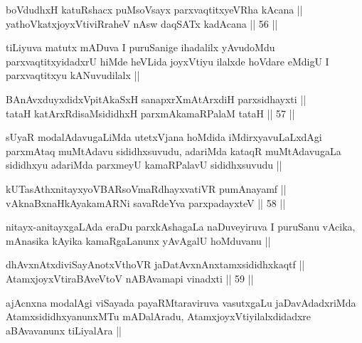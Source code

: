 \begin{shl}
boVdudhxH katuRshacx puMsoV\s sayx parxvaqtitxyeVRha kAcana ||  \\
yathoVkatxjoyxVtiviRraheV nAsw daqSATx kadAcana ||  56 ||  
\end{shl}

\begin{artha}
tiLiyuva matutx mADuva I puruSanige ihadalilx yAvudoMdu parxvaqtitxyidadxrU hiMde heVLida joyxVtiyu ilalxde hoVdare eMdigU I parxvaqtitxyu kANuvudilalx ||
\end{artha}

\begin{shl}
BAnAvxduyxdidxVpitAkaSxH sanapxrXmAtArxdiH parxsidhayxti || \\
tataH katArxRdisaMsididhxH parxmAkamaRPalaM tataH ||  57 ||  
\end{shl}

\begin{artha}
sUyaR modalAdavugaLiMda utetxVjana hoMdida iMdirxyavuLaLxdAgi parxmAtaq muMtAdavu sididhxsuvudu, adariMda kataqR muMtAdavugaLa sididhxyu adariMda parxmeyU kamaRPalavU sididhxsuvudu ||
\end{artha}

\begin{shl}
kUTasAthxnitayxyoVBARsoVmaRdhayxvatiVR pumAnayamf || \\
vAknaBxnaHkAyakamARNi savaRdeYva parxpadayxteV ||  58 ||  
\end{shl}

\begin{artha}
nitayx-anitayxgaLAda eraDu parxkAshagaLa naDuveyiruva I puruSanu vAcika, mAnasika kAyika kamaRgaLanunx yAvAgalU hoMduvanu ||
\end{artha}

\begin{shl}
dhAvxnAtxdiviSayAnotxV\s thoVR jaDatAvxnAnx\s \s tamxsididhxkaqtf || \\
AtamxjoyxVtiraBAveV\s toV nABAvamapi vinadxti ||  59 ||  
\end{shl}

\begin{artha}
ajAcnxna modalAgi viSayada payaRMtaraviruva vasutxgaLu jaDavAdadxriMda AtamxsididhxyanunxMTu mADalAradu, AtamxjoyxVtiyilalxdidadxre aBAvavanunx tiLiyalAra ||
\end{artha}


